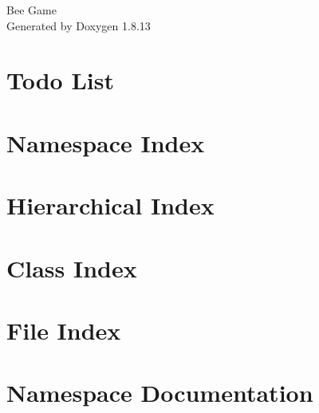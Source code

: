 \documentclass[twoside]{book}
\newcommand{\+}{\discretionary{\mbox{\scriptsize$\hookleftarrow$}}{}{}}
\newcommand{\clearemptydoublepage}{%
  \newpage{\pagestyle{empty}\cleardoublepage}%
}
\begin{document}
\hypersetup{pageanchor=false,
             bookmarksnumbered=true,
             pdfencoding=unicode
            }
\begin{titlepage}
\vspace*{7cm}
\begin{center}%
{\Large Bee Game }\\
\vspace*{1cm}
{\large Generated by Doxygen 1.8.13}\\
\end{center}
\end{titlepage}
\clearemptydoublepage
{}
\tableofcontents
\clearemptydoublepage
{}
\hypersetup{pageanchor=true}

\chapter{Todo List}
\label{todo}

\chapter{Namespace Index}

\chapter{Hierarchical Index}

\chapter{Class Index}

\chapter{File Index}

\chapter{Namespace Documentation}










\end{document}

